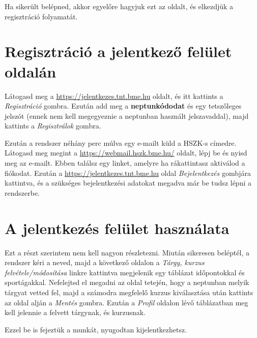 \documentclass[a4paper,10pt,titlepage]{article}
\begin{document}
Ha sikerült belépned, akkor egyelőre hagyjuk ezt az oldalt, és elkezdjük a regisztráció folyamatát.

\section{Regisztráció a jelentkező felület oldalán}

Látogasd meg a \href{https://jelentkezes.tnt.bme.hu}{https://jelentkezes.tnt.bme.hu} oldalt, és itt kattints a \textit{Regisztráció} gombra. Ezután add meg a \textbf{neptunkódodat} és egy tetszőleges jelszót (ennek nem kell megegyeznie a neptunban használt jelszavaddal), majd kattints a \textit{Regisztrálok} gombra.

Ezután a rendszer néhány perc múlva egy e-mailt küld a HSZK-s címedre. Látogasd meg megint a \href{https://webmail.hszk.bme.hu/}{https://webmail.hszk.bme.hu/} oldalt, lépj be és nyisd meg az e-mailt. Ebben találsz egy linket, amelyre ha rákattintasz aktiválod a fiókodat. Ezután a \href{https://jelentkezes.tnt.bme.hu}{https://jelentkezes.tnt.bme.hu} oldal \textit{Bejelentkezés} gombjára kattintva, és a szükséges bejelentkezési adatokat megadva már be tudsz lépni a rendszerbe.

\section{A jelentkezés felület használata}

Ezt a részt szerintem nem kell nagyon részletezni. Miután sikeresen beléptél, a rendszer kéri a neved, majd a következő oldalon a \textit{Tárgy, kurzus felvétele/módosítása} linkre kattintva megjelenik egy táblázat időpontokkal és sportágakkal. Nefelejtsd el megadni az oldal tetején, hogy a neptunban melyik tárgyat vetted fel, majd a számodra megfelelő kurzus kiválasztása után kattints az oldal alján a \textit{Mentés} gombra. Ezután a \textit{Profil} oldalon lévő táblázatban meg kell jelennie a felvett tárgynak, és kurzusnak.

Ezzel be is fejeztük a munkát, nyugodtan kijelentkezhetsz. 
\end{document}
